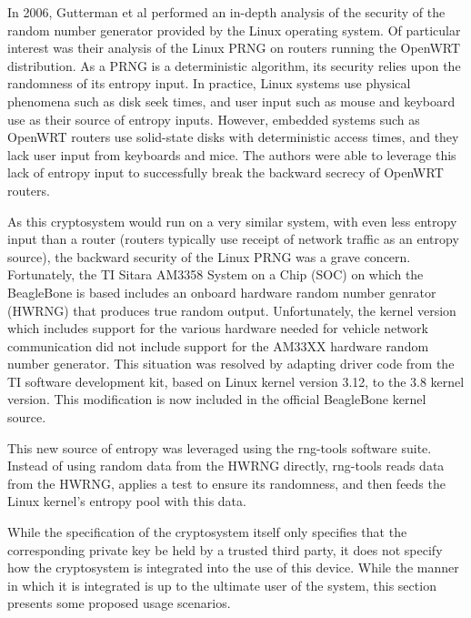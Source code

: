 In 2006, Gutterman et al \cite{Gutterman2006} performed an in-depth analysis of the security of the random number generator provided by the Linux operating system. 
Of particular interest was their analysis of the Linux PRNG on routers running the OpenWRT distribution. As a PRNG is a deterministic algorithm, its security 
relies upon the randomness of its entropy input. In practice, Linux systems use physical phenomena such as disk seek times, and user input
such as mouse and keyboard use as their source of entropy inputs. However, embedded systems such as OpenWRT routers use solid-state disks
with deterministic access times, and they lack user input from keyboards and mice. The authors were able to leverage this lack of entropy
input to successfully break the backward secrecy of OpenWRT routers.

As this cryptosystem would run on a very similar system, with even less entropy input than a router (routers typically use receipt of network
traffic as an entropy source), the backward security of the Linux PRNG was a grave concern. Fortunately, the TI Sitara AM3358 System on a Chip (SOC)
on which the BeagleBone is based includes an onboard hardware random number genrator (HWRNG) that produces true random output. Unfortunately, the
kernel version which includes support for the various hardware needed for vehicle network communication did not include support for the AM33XX
hardware random number generator. This situation was resolved by adapting driver code from the TI software development kit, based on Linux
kernel version 3.12, to the 3.8 kernel version. This modification is now included in the official BeagleBone kernel source.

This new source of entropy was leveraged using the rng-tools software suite. Instead of using random data from the HWRNG directly, rng-tools
reads data from the HWRNG, applies a test to ensure its randomness, and then feeds the Linux kernel's entropy pool with this data.


While the specification of the cryptosystem itself only specifies that the corresponding private key be held by a trusted third party, it does
not specify how the cryptosystem is integrated into the use of this device. While the manner in which it is integrated is up to the ultimate
user of the system, this section presents some proposed usage scenarios.


